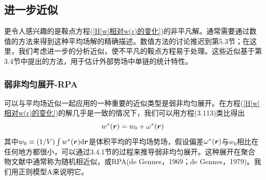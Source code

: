 \subsection{进一步近似}
更令人感兴趣的是鞍点方程(\ref{H[w]相对w(r)的变化})的非平凡解。通常需要通过数值的方法来得到这种平均场解的精确描述。数值方法的讨论推迟到第5.3节；在这里，我们考虑进一步的分析近似，使不平凡的鞍点方程易于处理。这些近似基于第3.4节中提出的方法，用于估计外部势场中单链的统计特性。
\subsubsection{弱非均匀展开-RPA}
可以与平均场近似一起应用的一种重要的近似类型是弱非均匀展开。在方程(\ref{H[w]相对w(r)的变化})的解几乎是一致的情况下，我们可以用方程(3.113)类比得出
\begin{equation}\label{5.23}
w^*(\bm{r})=w_0+\omega^*(\bm{r})
\end{equation}
其中$w_0\equiv(1/V)\int w^*(\bm{r})\mathrm{d}\bm{r}$是体积平均的平均场势场，假设偏差$\omega^*(\bm{r})$与$w_0$相比在任何地方都很小，可以通过3.4.1节的过程来推导弱非均匀展开。这种展开在聚合物文献中通常称为随机相近似，或RPA(de Gennes，1969；de Gennes，1979)。我们用正则模型A来说明它。

